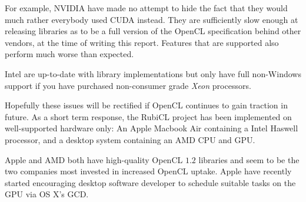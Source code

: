   For example, NVIDIA have made no attempt to hide the fact that they would much rather everybody used \ac{CUDA} instead. They are sufficiently slow enough at releasing libraries as to be a full version of the \ac{OpenCL} specification behind other vendors, at the time of writing this report. Features that are supported also perform much worse than expected.

  Intel are up-to-date with library implementations but only have full non-Windows support if you have purchased non-consumer grade \emph{Xeon} processors.

  Hopefully these issues will be rectified if \ac{OpenCL} continues to gain traction in future. As a short term response, the RubiCL project has been implemented on well-supported hardware only: An Apple Macbook Air containing a Intel Haswell processor, and a desktop system containing an \ac{AMD} \ac{CPU} and \ac{GPU}.

  Apple and \ac{AMD} both have high-quality \ac{OpenCL} $1.2$ libraries and seem to be the two companies most invested in increased \ac{OpenCL} uptake. Apple have recently started encouraging desktop software developer to schedule suitable tasks on the \ac{GPU} via OS X's \ac{GCD}.

